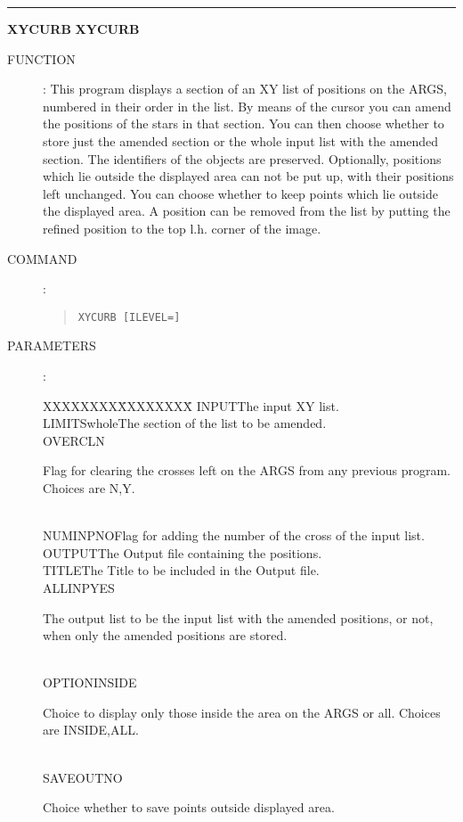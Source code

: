 \goodbreak
\rule{\textwidth}{0.3mm}
{\Large {\bf XYCURB} \hfill {\bf XYCURB}}
\begin{description}
\item [FUNCTION]:
This program displays a section of an XY list of positions on the ARGS,
numbered in their order in the list.
By means of the cursor you can amend the positions of the stars in that section.
You can then choose whether to store just the amended section or the whole input
list with the amended section.
The identifiers of the objects are preserved.
Optionally,  positions which lie outside the displayed area can not be put up,
with their positions left unchanged.
You can choose whether to keep points which lie outside the displayed area.
A position can be removed from the list by putting the refined position to the
top l.h. corner of the image.
\item [COMMAND]:
\begin{quote}
{\tt XYCURB  [ILEVEL=]}
\end{quote}
\item [PARAMETERS] :
\begin{tabbing}
XXXXXXXX\=XXXXXXXX\=\kill
INPUT\>\>The input XY list.\\
LIMITS\>whole\>The section of the list to be amended.\\
OVERCL\>N\>\begin{minipage}[t]{100mm}
Flag for clearing the crosses left on the ARGS from any previous program.
Choices are N,Y.
\end{minipage}\\
NUMINP\>NO\>Flag for adding the number of the cross of the input list.\\
OUTPUT\>\>The Output file containing the positions.\\
TITLE\>\>The Title to be included in the Output file.\\
ALLINP\>YES\>\begin{minipage}[t]{100mm}
The output list to be the input list with the amended positions, or not, when
only the amended positions are stored.
\end{minipage}\\
OPTION\>INSIDE\>\begin{minipage}[t]{100mm}
Choice to display only those inside the area on the ARGS or all.
Choices are INSIDE,ALL.
\end{minipage}\\
SAVEOUT\>NO\>\begin{minipage}[t]{100mm}
Choice whether to save points outside displayed area.

\end{minipage}
\end{tabbing}
\end{description}
